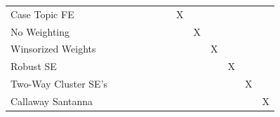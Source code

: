 \begin{center}
{\begin{tabular}{l*{12}{c}}
Case Topic FE       &              &              &              &              &              &              &           X  &              &              &              &              &              \\
No Weighting        &              &              &              &              &              &              &              &           X  &              &              &              &              \\
Winsorized Weights  &              &              &              &              &              &              &              &              &           X  &              &              &              \\
Robust SE           &              &              &              &              &              &              &              &              &              &           X  &              &              \\
Two-Way Cluster SE's&              &              &              &              &              &              &              &              &              &              &           X  &              \\
Callaway Santanna   &              &              &              &              &              &              &              &              &              &              &              &           X  \\
\bottomrule
\end{tabular}
}
\end{center}
